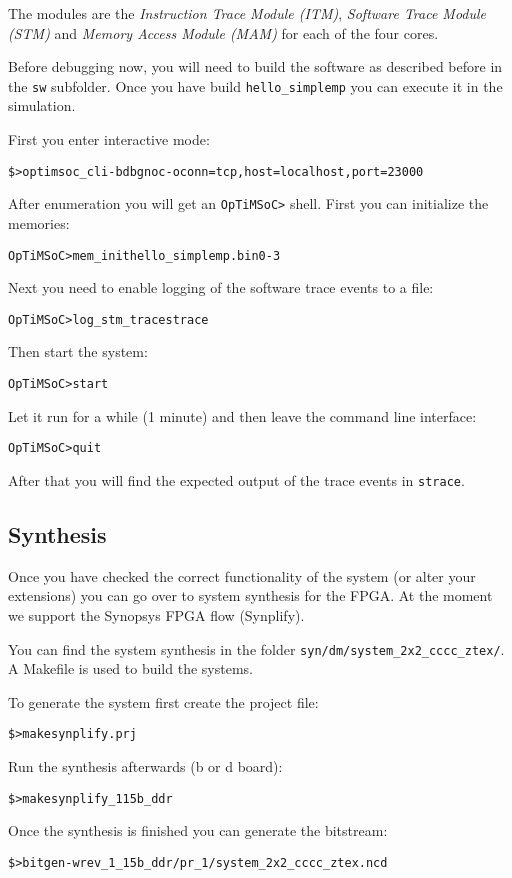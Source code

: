 The modules are the \emph{Instruction Trace Module (ITM)},
\emph{Software Trace Module (STM)} and \emph{Memory Access Module
  (MAM)} for each of the four cores.

Before debugging now, you will need to build the software as described
before in the \verb|sw| subfolder. Once you have build
\verb|hello_simplemp| you can execute it in the simulation.

First you enter interactive mode:

\begin{alltt}
\$> optimsoc_cli -bdbgnoc -oconn=tcp,host=localhost,port=23000
\end{alltt}

After enumeration you will get an \verb|OpTiMSoC>| shell. First you
can initialize the memories:

\begin{alltt}
OpTiMSoC> mem_init hello_simplemp.bin 0-3
\end{alltt}

Next you need to enable logging of the software trace events to a
file:

\begin{alltt}
OpTiMSoC> log_stm_trace strace
\end{alltt}

Then start the system:
\begin{alltt}
OpTiMSoC> start
\end{alltt}

Let it run for a while (1 minute) and then leave the command line
interface:
\begin{alltt}
OpTiMSoC> quit
\end{alltt}

After that you will find the expected output of the trace events in
\verb|strace|.

\subsection{Synthesis}

Once you have checked the correct functionality of the system (or
alter your extensions) you can go over to system synthesis for the
FPGA. At the moment we support the Synopsys FPGA flow (Synplify).

You can find the system synthesis in the folder
\verb|syn/dm/system_2x2_cccc_ztex/|. A Makefile is used to build the
systems.

To generate the system first create the project file:

\begin{alltt}
\$> make synplify.prj
\end{alltt}

Run the synthesis afterwards (b or d board):

\begin{alltt}
\$> make synplify_115b_ddr
\end{alltt}

Once the synthesis is finished you can generate the bitstream:

\begin{alltt}
\$> bitgen -w rev_1_15b_ddr/pr_1/system_2x2_cccc_ztex.ncd
\end{alltt}
